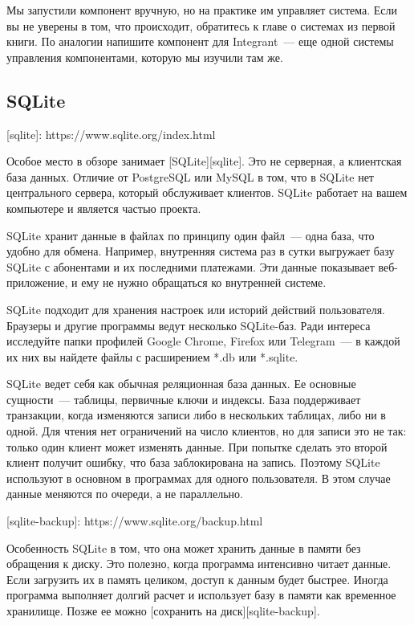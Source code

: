 Мы запустили компонент вручную, но на практике им управляет система. Если вы не уверены в том, что происходит, обратитесь к главе о системах из первой книги. По аналогии напишите компонент для Integrant~--- еще одной системы управления компонентами, которую мы изучили там же.

\subsection{SQLite}

[sqlite]: https://www.sqlite.org/index.html

Особое место в обзоре занимает [SQLite][sqlite]. Это не серверная, а клиентская база данных. Отличие от PostgreSQL или MySQL в том, что в SQLite нет центрального сервера, который обслуживает клиентов. SQLite работает на вашем компьютере и является частью проекта.

SQLite хранит данные в файлах по принципу один файл~--- одна база, что удобно для обмена. Например, внутренняя система раз в сутки выгружает базу SQLite с абонентами и их последними платежами. Эти данные показывает веб-приложение, и ему не нужно обращаться ко внутренней системе.

SQLite подходит для хранения настроек или историй действий пользователя. Браузеры и другие программы ведут несколько SQLite-баз. Ради интереса исследуйте папки профилей Google Chrome, Firefox или Telegram~--- в каждой их них вы найдете файлы с расширением *.db или *.sqlite.

SQLite ведет себя как обычная реляционная база данных. Ее основные сущности~--- таблицы, первичные ключи и индексы. База поддерживает транзакции, когда изменяются записи либо в нескольких таблицах, либо ни в одной. Для чтения нет ограничений на число клиентов, но для записи это не так: только один клиент может изменять данные. При попытке сделать это второй клиент получит ошибку, что база заблокирована на запись. Поэтому SQLite используют в основном в программах для одного пользователя. В этом случае данные меняются по очереди, а не параллельно.

[sqlite-backup]: https://www.sqlite.org/backup.html

Особенность SQLite в том, что она может хранить данные в памяти без обращения к диску. Это полезно, когда программа интенсивно читает данные. Если загрузить их в память целиком, доступ к данным будет быстрее. Иногда программа выполняет долгий расчет и использует базу в памяти как временное хранилище. Позже ее можно [сохранить на диск][sqlite-backup].

